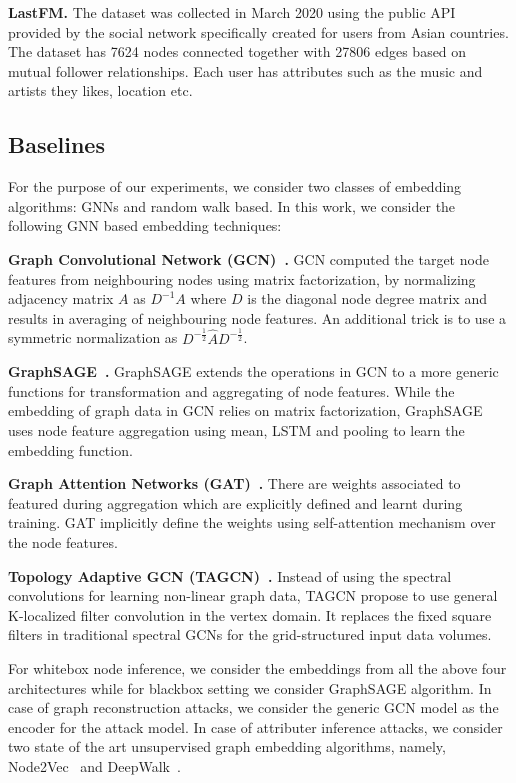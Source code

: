 \noindent\textbf{LastFM.} The dataset was collected in March 2020 using the public API provided by the social network specifically created for users from Asian countries.
The dataset has 7624 nodes connected together with 27806 edges based on mutual follower relationships.
Each user has attributes such as the music and artists they likes, location etc.


\subsection{Baselines}

\noindent For the purpose of our experiments, we consider two classes of embedding algorithms: GNNs and random walk based.
In this work, we consider the following GNN based embedding techniques:

\noindent\textbf{Graph Convolutional Network (GCN)~\cite{Kipf2016tc}.} GCN computed the target node features from neighbouring nodes using matrix factorization, by normalizing adjacency matrix $A$ as $D^{-1}A$ where $D$ is the diagonal node degree matrix and results in averaging of neighbouring node features.
An additional trick is to use a symmetric normalization as $D^{-\frac{1}{2}}\hat{A}D^{-\frac{1}{2}}$.

\noindent\textbf{GraphSAGE~\cite{NIPS20176703}.} GraphSAGE extends the operations in GCN to a more generic functions for transformation and aggregating of node features.
While the embedding of graph data in GCN relies on matrix factorization, GraphSAGE uses node feature aggregation using mean, LSTM and pooling to learn the embedding function.

\noindent\textbf{Graph Attention Networks (GAT)~\cite{velickovic2018graph}.} There are weights associated to featured during aggregation which are explicitly defined and learnt during training.
GAT implicitly define the weights using self-attention mechanism over the node features.

\noindent\textbf{Topology Adaptive GCN (TAGCN)~\cite{du2018topology}.} Instead of using the spectral convolutions for learning non-linear graph data, TAGCN propose to use general K-localized filter convolution in the vertex domain.
It replaces the fixed square filters in traditional spectral GCNs for the grid-structured input data volumes.

\noindent For whitebox node inference, we consider the embeddings from all the above four architectures while for blackbox setting we consider GraphSAGE algorithm.
In case of graph reconstruction attacks, we consider the generic GCN model as the encoder for the attack model.
In case of attributer inference attacks, we consider two state of the art unsupervised graph embedding algorithms, namely, Node2Vec~\cite{node2vec} and DeepWalk~\cite{deepwalk}.


